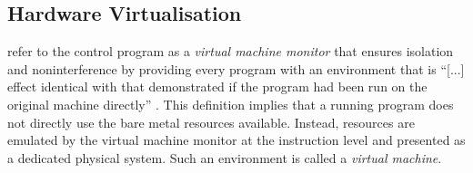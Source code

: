 \subsection{Hardware Virtualisation}
\label{ch:fundamentals/virtualisation/hardware-virtualisation}
\textcite{10.1145/361011.361073} refer to the control program as a \textit{virtual machine monitor} that 
ensures isolation and noninterference by providing every program with an environment that is \enquote{[...] effect
identical with that demonstrated if the program had been run on the original machine directly} 
\cite[2]{10.1145/361011.361073}. This definition implies that a running program does not directly use
the bare metal resources available. Instead, resources are emulated by the virtual machine monitor at
the instruction level and presented as a dedicated physical system. Such an environment is called 
a \textit{virtual machine}.

